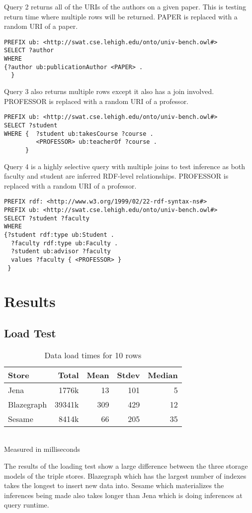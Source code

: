 \documentclass{llncs}
\begin{document}
\smallskip

Query 2 returns all of the URIs of the authors on a given paper.  This is testing return time where multiple rows will be returned.  PAPER is replaced with a random URI of a paper.

\begin{lstlisting}[caption=Query 2]
PREFIX ub: <http://swat.cse.lehigh.edu/onto/univ-bench.owl#>
SELECT ?author
WHERE
{?author ub:publicationAuthor <PAPER> .
  }
\end{lstlisting}
\smallskip

Query 3 also returns multiple rows except it also has a join involved.  PROFESSOR is replaced with a random URI of a professor.

\begin{lstlisting}[caption=Query 3]
PREFIX ub: <http://swat.cse.lehigh.edu/onto/univ-bench.owl#>
SELECT ?student
WHERE {  ?student ub:takesCourse ?course .
         <PROFESSOR> ub:teacherOf ?course .
      }
\end{lstlisting}

\smallskip

Query 4 is a highly selective query with multiple joins to test inference as both faculty and student are inferred RDF-level relationships.  PROFESSOR is replaced with a random URI of a professor.

\begin{lstlisting}[caption=Query 4]
PREFIX rdf: <http://www.w3.org/1999/02/22-rdf-syntax-ns#>
PREFIX ub: <http://swat.cse.lehigh.edu/onto/univ-bench.owl#>
SELECT ?student ?faculty
WHERE
{?student rdf:type ub:Student .
  ?faculty rdf:type ub:Faculty .
  ?student ub:advisor ?faculty 
  values ?faculty { <PROFESSOR> }
 }
\end{lstlisting}
\clearpage

\section{Results}
\subsection{Load Test}
\begin{table}
\begin{center}
\caption{Data load times for 10 rows}
\begin{tabular}{l | r r r r }
Store & Total & Mean & Stdev & Median \\
\hline
Jena & 1776k & 13 & 101 & 5 \\
Blazegraph & 39341k & 309 & 429 & 12 \\
Sesame & 8414k & 66 & 205 & 35
\end{tabular}
\\[5pt]
Measured in milliseconds
\end{center}
\end{table}
The results of the loading test show a large difference between the three storage models of the triple stores.  Blazegraph which has the largest number of indexes takes the longest to insert new data into.  Sesame which materializes the inferences being made also takes longer than Jena which is doing inferences at query runtime.
\end{document}
